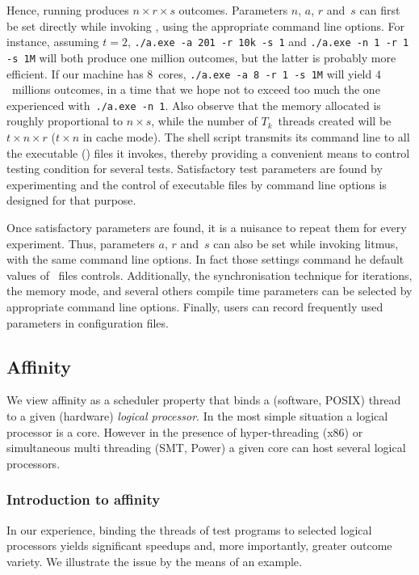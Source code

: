 Hence, running  produces $n \times r \times s$ outcomes.
Parameters $n$, $a$, $r$ and~$s$ can first be set directly while
invoking , using the appropriate command line options.
For instance, assuming $t=2$,
\verb+./a.exe -a 201 -r 10k -s 1+ and \verb+./a.exe -n 1 -r 1 -s 1M+
will both produce one million outcomes, but the latter is probably
more efficient.
If our machine has $8$~cores,
\verb+./a.exe -a 8 -r 1 -s 1M+ will yield $4$~millions outcomes,
in a time that we hope not to exceed too much the one experienced
with~\verb+./a.exe -n 1+.
Also observe that the memory allocated is roughly proportional
to $n \times s$, while the number of $T_k$~threads created will be
$t \times n \times r$ ($t \times n$ in cache mode).
The  shell script transmits its command line to all
the executable () files
it invokes, thereby providing a convenient means
to control testing condition for several tests.
Satisfactory test parameters are found by experimenting and
the control of executable files by command line options is designed for
that purpose.

Once satisfactory parameters are found, it is a nuisance to repeat them
for every experiment.
Thus, parameters $a$, $r$ and~$s$ can also be set while invoking litmus,
with the same command line options. In fact those settings command
he default values of ~files controls.
Additionally, the synchronisation technique for iterations,
the memory mode, and several others compile time parameters
can be selected by appropriate \litmus{} command line options.
Finally, users can record frequently used parameters in configuration files.

\subsection{Affinity\label{sec:affinity}}

We view affinity as
a scheduler property that binds a (software, POSIX) thread to
a given (hardware) \emph{logical processor}.
In the most simple situation a logical processor is a core.
However in the presence of hyper-threading (x86) or simultaneous multi threading
(SMT, Power) a given core can host several logical processors.

\subsubsection{Introduction to affinity}
In our experience,
binding the threads of test programs to selected logical processors
yields significant speedups and, more importantly, greater outcome variety.
We illustrate the issue by the means of an example.


